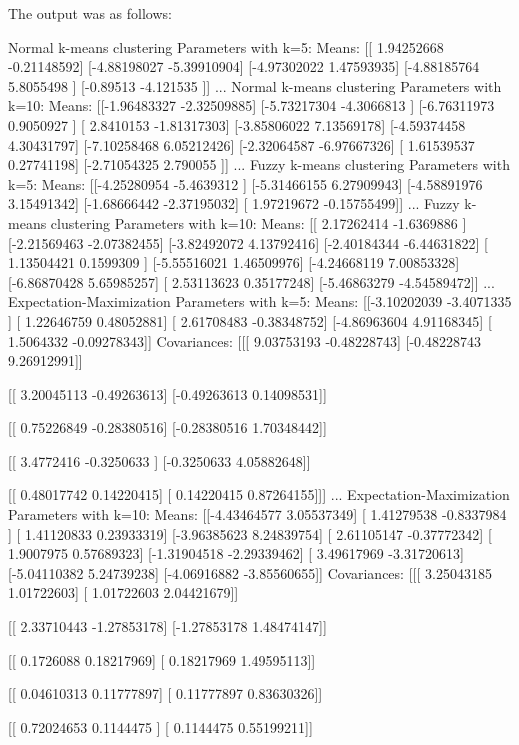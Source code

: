\documentclass{article}
\begin{document}
{The output was as follows:
\begin{spverbatim}
Normal k-means clustering Parameters with k=5:
Means: [[ 1.94252668 -0.21148592]
 [-4.88198027 -5.39910904]
 [-4.97302022  1.47593935]
 [-4.88185764  5.8055498 ]
 [-0.89513    -4.121535  ]]
...
Normal k-means clustering Parameters with k=10:
Means: [[-1.96483327 -2.32509885]
 [-5.73217304 -4.3066813 ]
 [-6.76311973  0.9050927 ]
 [ 2.8410153  -1.81317303]
 [-3.85806022  7.13569178]
 [-4.59374458  4.30431797]
 [-7.10258468  6.05212426]
 [-2.32064587 -6.97667326]
 [ 1.61539537  0.27741198]
 [-2.71054325  2.790055  ]]
...
Fuzzy k-means clustering Parameters with k=5:
Means: [[-4.25280954 -5.4639312 ]
 [-5.31466155  6.27909943]
 [-4.58891976  3.15491342]
 [-1.68666442 -2.37195032]
 [ 1.97219672 -0.15755499]]
...
Fuzzy k-means clustering Parameters with k=10:
Means: [[ 2.17262414 -1.6369886 ]
 [-2.21569463 -2.07382455]
 [-3.82492072  4.13792416]
 [-2.40184344 -6.44631822]
 [ 1.13504421  0.1599309 ]
 [-5.55516021  1.46509976]
 [-4.24668119  7.00853328]
 [-6.86870428  5.65985257]
 [ 2.53113623  0.35177248]
 [-5.46863279 -4.54589472]]
...
Expectation-Maximization Parameters with k=5:
Means: [[-3.10202039 -3.4071335 ]
 [ 1.22646759  0.48052881]
 [ 2.61708483 -0.38348752]
 [-4.86963604  4.91168345]
 [ 1.5064332  -0.09278343]]
Covariances: [[[ 9.03753193 -0.48228743]
  [-0.48228743  9.26912991]]

 [[ 3.20045113 -0.49263613]
  [-0.49263613  0.14098531]]

 [[ 0.75226849 -0.28380516]
  [-0.28380516  1.70348442]]

 [[ 3.4772416  -0.3250633 ]
  [-0.3250633   4.05882648]]

 [[ 0.48017742  0.14220415]
  [ 0.14220415  0.87264155]]]
...
Expectation-Maximization Parameters with k=10:
Means: [[-4.43464577  3.05537349]
 [ 1.41279538 -0.8337984 ]
 [ 1.41120833  0.23933319]
 [-3.96385623  8.24839754]
 [ 2.61105147 -0.37772342]
 [ 1.9007975   0.57689323]
 [-1.31904518 -2.29339462]
 [ 3.49617969 -3.31720613]
 [-5.04110382  5.24739238]
 [-4.06916882 -3.85560655]]
Covariances: [[[ 3.25043185  1.01722603]
  [ 1.01722603  2.04421679]]

 [[ 2.33710443 -1.27853178]
  [-1.27853178  1.48474147]]

 [[ 0.1726088   0.18217969]
  [ 0.18217969  1.49595113]]

 [[ 0.04610313  0.11777897]
  [ 0.11777897  0.83630326]]

 [[ 0.72024653  0.1144475 ]
  [ 0.1144475   0.55199211]]


\end{spverbatim}}
\end{document}
